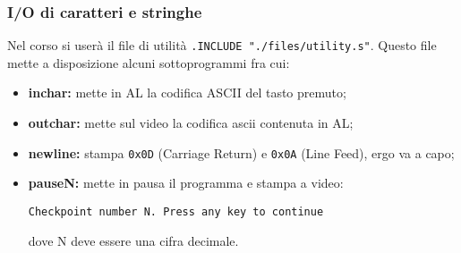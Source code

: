\documentclass[a4paper,11pt]{article}
\begin{document}
\subsubsection{I/O di caratteri e stringhe}
Nel corso si userà il file di utilità \lstinline|.INCLUDE "./files/utility.s"|.
Questo file mette a disposizione alcuni sottoprogrammi fra cui:
\begin{itemize}
	\item \textbf{inchar:} mette in AL la codifica ASCII del tasto premuto;
	\item \textbf{outchar:} mette sul video la codifica ascii contenuta in AL;
	\item \textbf{newline:} stampa \lstinline|0x0D| (Carriage Return) e \lstinline|0x0A| (Line Feed), ergo va a capo;
	\item \textbf{pauseN:} mette in pausa il programma e stampa a video:
\begin{lstlisting}	
Checkpoint number N. Press any key to continue
\end{lstlisting}
dove N deve essere una cifra decimale.
\end{itemize}
\end{document}
